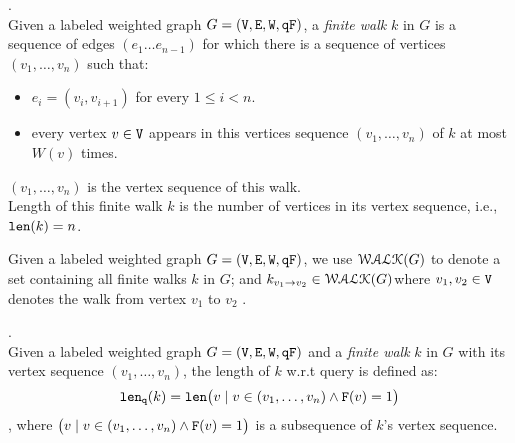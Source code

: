 %
%
\begin{defn}.
\label{def:finitewalk}
\\
Given a labeled weighted graph $G = (\mathtt{V}, \mathtt{E}, \mathtt{W}, \mathtt{qF})$, a \emph{finite walk} $k$ in $G$ is a sequence of edges $(e_1 \ldots e_{n - 1})$ 
for which there is a sequence of vertices $(v_1, \ldots, v_{n})$ such that:
\begin{itemize}
    \item $e_i = (v_{i},v_{i + 1})$ for every $1 \leq i < n$.
    \item every vertex $v \in \mathtt{V}$ appears in this vertices sequence $(v_1, \ldots, v_{n})$ of $k$ at most $W(v)$ times.  
\end{itemize}
$(v_1, \ldots, v_{n})$ is the vertex sequence of this walk.
\\
%
Length of this finite walk $k$ is the number of vertices in its vertex sequence, i.e., $\mathtt{len}(k) = n$.
\end{defn}
%
Given a labeled weighted graph $G = (\mathtt{V}, \mathtt{E}, \mathtt{W}, \mathtt{qF})$, 
we use $\mathcal{WALK}(G)$ to denote a set containing all finite walks $k$ in $G$;
and $k_{v_1 \to v_2} \in \mathcal{WALK}(G)$where $v_1, v_2 \in \mathtt{V}$ denotes the walk from vertex $v_1$ to $v_2$ .
%
%
\begin{defn}.
\label{def:qlen}
\\
Given a labeled weighted graph $G = (\mathtt{V}, \mathtt{E}, \mathtt{W}, \mathtt{qF})$ and a \emph{finite walk} $k$ in $G$ with its vertex sequence $(v_1, \ldots, v_{n})$, the length of $k$ w.r.t query is defined as:
\[
  \mathtt{len}_{\tt q}(k) = \mathtt{len}\big(
  v \mid v \in (v_1, \ldots, v_{n}) \land \mathtt{F}(v) = 1 \big)
\]
, where $\big(v \mid v \in (v_1, \ldots, v_{n}) \land \mathtt{F}(v) = 1 \big)$ is a subsequence of $k$'s vertex sequence.
\end{defn}
%
